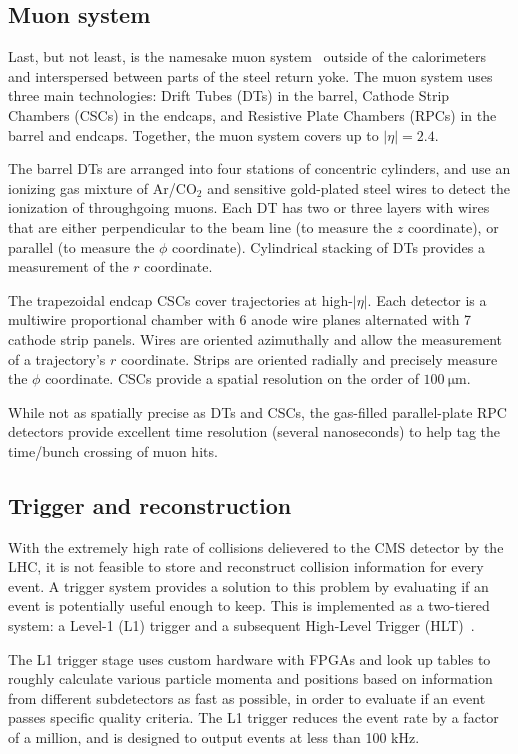 \subsection{Muon system}

Last, but not least, is the namesake muon system~\cite{CMS:Sirunyan2018fpa} outside of the calorimeters
and interspersed between parts of the steel return yoke. The muon system
uses three main technologies: Drift Tubes (DTs) in the barrel, Cathode
Strip Chambers (CSCs) in the endcaps, and Resistive Plate Chambers (RPCs)
in the barrel and endcaps. Together, the muon system covers up to $|\eta|=2.4$.

The barrel DTs are arranged into four stations of concentric cylinders,
and use an ionizing gas mixture of Ar/CO${}_2$ and sensitive gold-plated steel wires
to detect the ionization of throughgoing muons. Each DT has two or three layers
with wires that are either perpendicular to the beam line (to measure the $z$ coordinate),
or parallel (to measure the $\phi$ coordinate). Cylindrical stacking of
DTs provides a measurement of the $r$ coordinate.

The trapezoidal endcap CSCs cover trajectories at high-$|\eta|$. Each
detector is a multiwire proportional chamber with 6 anode wire planes alternated
with 7 cathode strip panels. Wires are oriented azimuthally and allow the measurement
of a trajectory's $r$ coordinate. Strips are oriented radially and precisely measure
the $\phi$ coordinate. CSCs provide a spatial resolution on the order of $100~\mathrm{\mu m}$.

While not as spatially precise as DTs and CSCs, the gas-filled parallel-plate RPC detectors provide excellent
time resolution (several nanoseconds) to help tag the time/bunch crossing of muon hits.

\subsection{Trigger and reconstruction}

With the extremely high rate of collisions delievered to the CMS detector by the LHC,
it is not feasible to store and reconstruct collision information for every event.
A trigger system provides a solution to this problem by evaluating if
an event is potentially useful enough to keep. This is implemented
as a two-tiered system: a Level-1 (L1) trigger and a subsequent High-Level Trigger (HLT)~\cite{CMS:Khachatryan2016bia}.

The L1 trigger stage uses custom hardware with FPGAs and look up tables to
roughly calculate various particle momenta and positions based
on information from different subdetectors
as fast as possible, in order to evaluate if an event passes specific quality
criteria. The L1 trigger reduces the event rate by a factor of a million, and is designed
to output events at less than 100 kHz.

